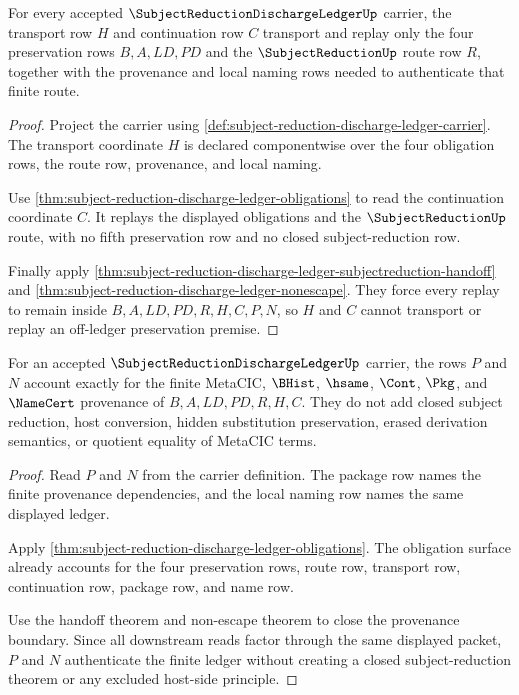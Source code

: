 \begin{theorem}
\label{thm:subject-reduction-discharge-ledger-transport-replay}
For every accepted $\SubjectReductionDischargeLedgerUp$ carrier, the transport row $H$ and continuation row $C$ transport and replay only the four preservation rows $B,A,LD,PD$ and the $\SubjectReductionUp$ route row $R$, together with the provenance and local naming rows needed to authenticate that finite route.
\end{theorem}
\begin{proof}
Project the carrier using \autoref{def:subject-reduction-discharge-ledger-carrier}. The transport coordinate $H$ is declared componentwise over the four obligation rows, the route row, provenance, and local naming.

Use \autoref{thm:subject-reduction-discharge-ledger-obligations} to read the continuation coordinate $C$. It replays the displayed obligations and the $\SubjectReductionUp$ route, with no fifth preservation row and no closed subject-reduction row.

Finally apply \autoref{thm:subject-reduction-discharge-ledger-subjectreduction-handoff} and \autoref{thm:subject-reduction-discharge-ledger-nonescape}. They force every replay to remain inside $B,A,LD,PD,R,H,C,P,N$, so $H$ and $C$ cannot transport or replay an off-ledger preservation premise.
\end{proof}

\begin{theorem}
\label{thm:subject-reduction-discharge-ledger-provenance-exactness}
For an accepted $\SubjectReductionDischargeLedgerUp$ carrier, the rows $P$ and $N$ account exactly for the finite MetaCIC, $\BHist$, $\hsame$, $\Cont$, $\Pkg$, and $\NameCert$ provenance of $B,A,LD,PD,R,H,C$. They do not add closed subject reduction, host conversion, hidden substitution preservation, erased derivation semantics, or quotient equality of MetaCIC terms.
\end{theorem}
\begin{proof}
Read $P$ and $N$ from the carrier definition. The package row names the finite provenance dependencies, and the local naming row names the same displayed ledger.

Apply \autoref{thm:subject-reduction-discharge-ledger-obligations}. The obligation surface already accounts for the four preservation rows, route row, transport row, continuation row, package row, and name row.

Use the handoff theorem and non-escape theorem to close the provenance boundary. Since all downstream reads factor through the same displayed packet, $P$ and $N$ authenticate the finite ledger without creating a closed subject-reduction theorem or any excluded host-side principle.
\end{proof}

